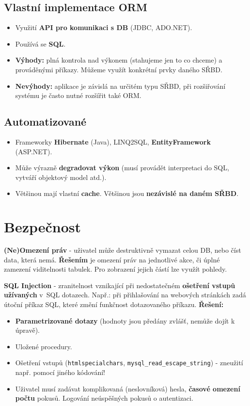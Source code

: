 \subsection{Vlastní implementace ORM}
\begin{itemize}
    \item Využití \textbf{API pro komunikaci s DB} (JDBC, ADO.NET).
    \item Používá se \textbf{SQL}.
    \item \textbf{Výhody:} plná kontrola nad výkonem (stahujeme jen to co chceme) a prováděnými příkazy. Můžeme využít konkrétní prvky daného SŘBD.
    \item \textbf{Nevýhody:} aplikace je závislá na určitém typu SŘBD, při rozšiřování systému je často nutné rozšířit také ORM.
\end{itemize}

\subsection{Automatizované}
\begin{itemize}
    \item Frameworky \textbf{Hibernate} (Java), LINQ2SQL, \textbf{EntityFramework} (ASP.NET).
    \item Může výrazně \textbf{degradovat výkon} (musí provádět interpretaci do SQL, vytváří objektový model atd.).
    \item Většinou mají vlastní \textbf{cache}. Většinou jsou \textbf{nezávislé na daném SŘBD}.
\end{itemize}

\section{Bezpečnost}
\textbf{(Ne)Omezení práv} - uživatel může destruktivně vymazat celou DB, nebo číst data, která nemá. \textbf{Řešením} je omezení práv na jednotlivé akce, či úplné zamezení viditelnosti tabulek. Pro zobrazení jejich částí lze využít pohledy.

\textbf{SQL Injection} - zranitelnost vznikající při nedostatečném \textbf{ošetření vstupů užívaných} v SQL dotazech. Např.: při přihlašování na webových stránkách zadá útoční příkaz SQL, které změní funkčnost dotazovaného příkazu. \textbf{Řešení:}
\begin{itemize}
    \item \textbf{Parametrizované dotazy} (hodnoty jsou předány zvlášť, nemůže dojít k úpravě).
    \item Uložené procedury.
    \item Ošetření vstupů (\texttt{htmlspecialchars}, \texttt{mysql\_read\_escape\_string}) - zneužití např. pomocí jiného kódování!
    \item Uživatel musí zadávat komplikovaná (neslovníková) hesla, \textbf{časové omezení počtu} pokusů. Logování neúspěšných pokusů o autentizaci.
\end{itemize}


